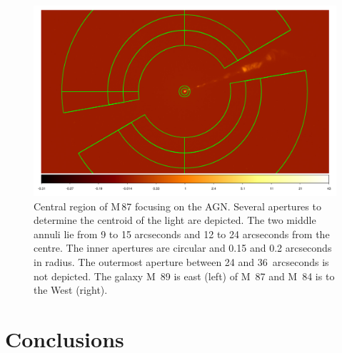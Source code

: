 \documentclass[useAMS,usenatbib]{mn2e}
\begin{document}
\begin{figure}
  \includegraphics[width=\columnwidth]{ds9.pdf}
  \caption{Central region of M\,87 focusing on the AGN.  Several
    apertures to determine the centroid of the light are depicted.
    The two middle annuli lie from 9 to 15 arcseconds and 12 to 24
    arcseconds from the centre.  The inner apertures are circular and
    0.15 and 0.2 arcseconds in radius. The outermost aperture between
    24 and 36~arcseconds is not depicted.  The galaxy M~89 is east
    (left) of M~87 and M~84 is to the West (right).}
  \label{fig:M87}
\end{figure}

\section{Conclusions}
\label{conclusions}
\end{document}
